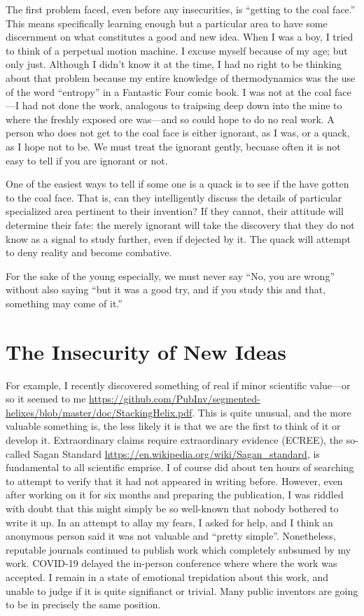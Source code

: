 \documentclass[
	fontsize=10pt, %
	twoside=false, %
	secnumdepth=1, %
]{kaobook}
\begin{document}
The first problem faced, even before any insecurities,
is ``getting to the coal face.''
This means specifically learning enough but a particular
area to have some discernment on what constitutes a good and new idea.
When I was a boy, I tried to think of a perpetual motion machine.
I excuse myself because of my age; but only just.
Although I didn't know it at the time, I had no right to be
thinking about that problem because my entire knowledge of
thermodynamics was the use of the word ``entropy'' in a Fantastic Four comic book.
I was not at the coal face---I had not done the work, analogous to traipsing
deep down into the mine to where the freshly exposed ore was---and so could
hope to do no real work.
A person who does not get to the coal face is either ignorant,
as I was, or a quack, as I hope not to be.
We must treat the ignorant gently, becuase often it is not
easy to tell if you are ignorant or not.

One of the easiest ways to tell if some one is a quack is
to see if the have gotten to the coal face.
That is, can they intelligently discuss the details
of particular specialized area pertinent to their invention?
If they cannot, their attitude will determine their fate:
the merely ignorant will take the discovery that they
do not know as a signal to study further, even if dejected by it.
The quack will attempt to deny reality and become combative.

For the sake of the young especially, we must never say
``No, you are wrong'' without also saying ``but it was
a good try, and if you study this and that, something may come of it.''


\section{The Insecurity of New Ideas}

For example, I recently discovered something of
real if minor scientific value---or so it seemed to me \url{https://github.com/PubInv/segmented-helixes/blob/master/doc/StackingHelix.pdf}.
This is quite unusual, and the more valuable something is,
the less likely it is that we are the first to think of it
or develop it.
Extraordinary claims require extraordinary evidence (ECREE),
the so-called Sagan Standard \url{https://en.wikipedia.org/wiki/Sagan_standard},
is fundamental to all scientific emprise.
I of course did about ten hours of searching to
attempt to verify that it had not appeared in writing before.
However, even after working on it for six months and preparing
the publication, I was riddled with doubt that this might simply
be so well-known that nobody bothered to write it up.
In an attempt to allay my fears, I asked for help, and
I think an anonymous person said it was not valuable and ``pretty simple''.
Nonetheless, reputable journals continued to publish work
which completely subsumed by my work. COVID-19 delayed the
in-person conference where where the work was accepted.
I remain in a state of emotional trepidation about this work,
and unable to judge if it is quite signifianct or trivial.
Many public inventors are going to be in precisely the
same position.
\end{document}

